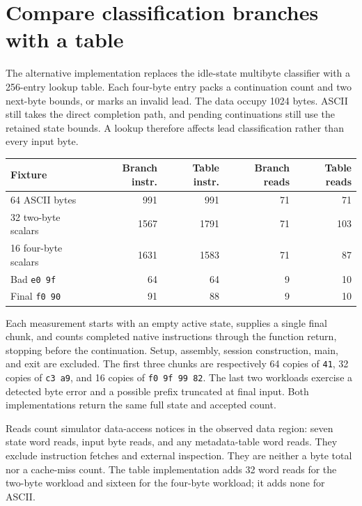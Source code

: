 \section{Compare classification branches with a table}\label{utf8-measurement}
The alternative implementation replaces the idle-state multibyte classifier with
a 256-entry lookup table. Each four-byte entry packs a continuation count and two
next-byte bounds, or marks an invalid lead. The data occupy 1024 bytes. ASCII still
takes the direct completion path, and pending continuations still use the retained
state bounds. A lookup therefore affects lead classification rather than every
input byte.

\begin{longtable}{lrrrr}
  \toprule Fixture     & Branch instr. & Table instr. & Branch reads & Table reads \\\midrule
  64 ASCII bytes       & 991           & 991          & 71           & 71          \\
  32 two-byte scalars  & 1567          & 1791         & 71           & 103         \\
  16 four-byte scalars & 1631          & 1583         & 71           & 87          \\
  Bad \texttt{e0 9f}   & 64            & 64           & 9            & 10          \\
  Final \texttt{f0 90} & 91            & 88           & 9            & 10          \\\bottomrule
\end{longtable}
Each measurement starts with an empty active state, supplies a single final chunk,
and counts completed native instructions through the function return, stopping
before the continuation. Setup, assembly, session construction, main, and exit are
excluded. The first three chunks are respectively 64 copies of \texttt{41}, 32
copies of \texttt{c3 a9}, and 16 copies of \texttt{f0 9f 99 82}. The last two
workloads exercise a detected byte error and a possible prefix truncated at final
input. Both implementations return the same full state and accepted count.

Reads count simulator data-access notices in the observed data region: seven state
word reads, input byte reads, and any metadata-table word reads. They exclude
instruction fetches and external inspection. They are neither a byte total nor a
cache-miss count. The table implementation adds 32 word reads for the two-byte
workload and sixteen for the four-byte workload; it adds none for ASCII.

